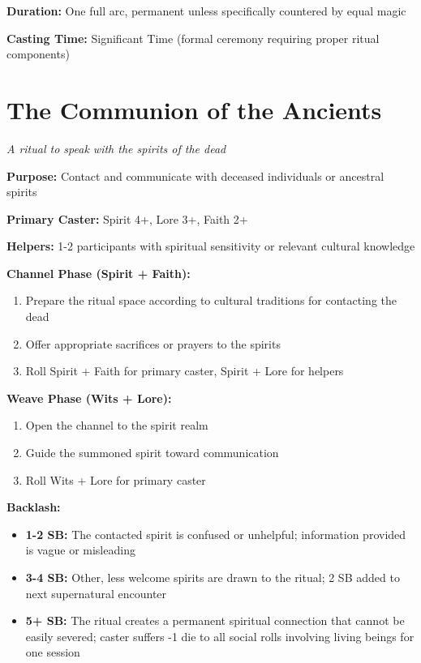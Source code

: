 \documentclass[12pt,twoside]{book}
\begin{document}
\textbf{Duration:} One full arc, permanent unless specifically countered by equal magic

\textbf{Casting Time:} Significant Time (formal ceremony requiring proper ritual components)

\section*{The Communion of the Ancients}
\textit{A ritual to speak with the spirits of the dead}

\textbf{Purpose:} Contact and communicate with deceased individuals or ancestral spirits

\textbf{Primary Caster:} Spirit 4+, Lore 3+, Faith 2+

\textbf{Helpers:} 1-2 participants with spiritual sensitivity or relevant cultural knowledge

\textbf{Channel Phase (Spirit + Faith):}
\begin{enumerate}
\item Prepare the ritual space according to cultural traditions for contacting the dead
\item Offer appropriate sacrifices or prayers to the spirits
\item Roll Spirit + Faith for primary caster, Spirit + Lore for helpers
\end{enumerate}

\textbf{Weave Phase (Wits + Lore):}
\begin{enumerate}
\item Open the channel to the spirit realm
\item Guide the summoned spirit toward communication
\item Roll Wits + Lore for primary caster
\end{enumerate}

\textbf{Backlash:}
\begin{itemize}
\item \textbf{1-2 SB:} The contacted spirit is confused or unhelpful; information provided is vague or misleading
\item \textbf{3-4 SB:} Other, less welcome spirits are drawn to the ritual; 2 SB added to next supernatural encounter
\item \textbf{5+ SB:} The ritual creates a permanent spiritual connection that cannot be easily severed; caster suffers -1 die to all social rolls involving living beings for one session
\end{itemize}
\end{document}
